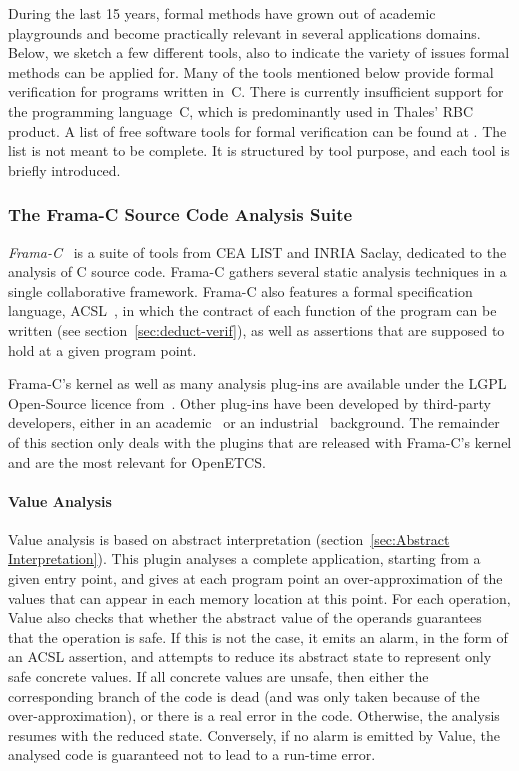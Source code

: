 \documentclass{template/openetcs_report}
\newcommand{\cxx}{C\nolinebreak[4]\hspace{-.05em}\raisebox{.3ex}{\footnotesize\bf ++}\xspace}
\begin{document}
During the last 15 years, formal methods have grown out of academic
playgrounds and become practically relevant in several applications
domains.
Below, we sketch a few different tools, also to indicate the variety
of issues formal methods can be applied for.
Many of the tools mentioned below provide formal verification for programs
written in~C.
There is currently insufficient support for the programming language~\cxx,
which is predominantly used in Thales' RBC product.
%
A list of free software tools for formal verification
can be found at \cite{gulliver}.
%
The list is not meant to be complete.
%
It is structured by tool purpose, and each tool is briefly
introduced.

\subsubsection{The Frama-C Source Code Analysis Suite}
\label{sec:Frama-C}

{\em Frama-C}~\cite{Cuoq.2012} is a suite of tools 
from CEA LIST and INRIA Saclay, dedicated to the analysis of C source code.
Frama-C gathers several static analysis techniques in a single
collaborative framework. Frama-C also features a formal specification language,
ACSL~\cite{ACSL}, in which the contract of each function of the program can
be written (see section~\ref{sec:deduct-verif}), as well as assertions that
are supposed to hold at a given program point.

Frama-C's kernel as well as many analysis plug-ins are available under the
LGPL Open-Source licence from~\cite{frama-c}. Other plug-ins have been
developed by third-party developers, either in an academic~\cite{Bouajjani.2011}
or an industrial~\cite{Ledinot.Pariente.2010} background. The remainder of this
section only deals with the plugins that are released with Frama-C's kernel and
are the most relevant for OpenETCS.

\paragraph{Value Analysis} 
Value analysis is based on abstract interpretation 
(section~\ref{sec:Abstract Interpretation}). This plugin analyses a
complete application, starting from a given entry point, and gives at
each program point an over-approximation of the values that can appear
in each memory location at this point. For each operation, Value also
checks that whether the abstract value of the operands guarantees that
the operation is safe. If this is not the case, it emits an alarm, in
the form of an ACSL assertion, and attempts to reduce its abstract
state to represent only safe concrete values. If all concrete values
are unsafe, then either the corresponding branch of the code is dead
(and was only taken because of the over-approximation), or there is a
real error in the code. Otherwise, the analysis resumes with the
reduced state. Conversely, if no alarm is emitted by Value, the
analysed code is guaranteed not to lead to a run-time error.
\end{document}
